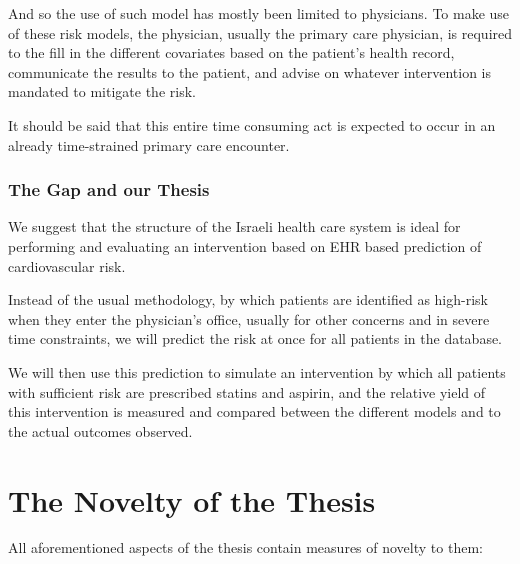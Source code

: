 \documentclass[a4paper,12pt]{article}
\begin{document}
			And so the use of such model has mostly been limited to physicians. To make use of these risk models, the physician, usually the primary care physician, is required to the fill in the different covariates based on the patient's health record, communicate the results to the patient, and advise on whatever intervention is mandated to mitigate the risk.
			
			It should be said that this entire time consuming act is expected to occur in an already time-strained primary care encounter\cite{Konrad2010}.
			
			\subsubsection{The Gap and our Thesis}
			
			We suggest that the structure of the Israeli health care system is ideal for performing and evaluating an intervention based on EHR based prediction of cardiovascular risk.
			
			Instead of the usual methodology, by which patients are identified as high-risk when they enter the physician's office, usually for other concerns and in severe time constraints, we will predict the risk at once for all patients in the database.
			
			We will then use this  prediction to simulate an intervention by which all patients with sufficient risk are prescribed statins and aspirin, and the relative yield of this intervention is measured and compared between the different models and to the actual outcomes observed.
	
	\section{The Novelty of the Thesis}
	
	All aforementioned aspects of the thesis contain measures of novelty to them:
	
\end{document}
